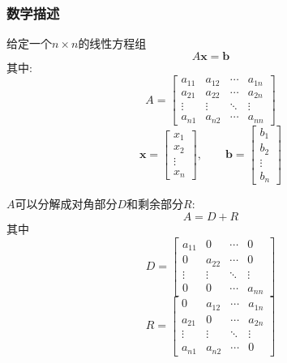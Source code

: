 \documentclass[twoside,twocolumn]{article}
\begin{document}
\begin{CJK*}{UTF8}{gkai}
	\subsubsection{数学描述}
	给定一个$n\times n$的线性方程组
	\begin{equation*}
	A\mathbf{x}=\mathbf{b}
	\end{equation*}
	其中:
	\begin{equation*}
	A={\begin{bmatrix}a_{11}&a_{12}&\cdots &a_{1n}\\a_{21}&a_{22}&\cdots &a_{2n}\\\vdots &\vdots &\ddots &\vdots \\a_{n1}&a_{n2}&\cdots &a_{nn}\end{bmatrix}}
	\end{equation*}
	\begin{equation*}
	\mathbf {x} ={\begin{bmatrix}x_{1}\\x_{2}\\\vdots \\x_{n}\end{bmatrix}},\qquad \mathbf {b} ={\begin{bmatrix}b_{1}\\b_{2}\\\vdots \\b_{n}\end{bmatrix}}
	\end{equation*}
	
	$A$可以分解成对角部分$D$和剩余部分$R$:
	\begin{equation*}
	A=D+R
	\end{equation*}
	其中
	\begin{equation*}
	D={\begin{bmatrix}a_{11}&0&\cdots &0\\0&a_{22}&\cdots &0\\\vdots &\vdots &\ddots &\vdots \\0&0&\cdots &a_{nn}\end{bmatrix}}
	\end{equation*}
	\begin{equation*}
	R={\begin{bmatrix}0&a_{12}&\cdots &a_{1n}\\a_{21}&0&\cdots &a_{2n}\\\vdots &\vdots &\ddots &\vdots \\a_{n1}&a_{n2}&\cdots &0\end{bmatrix}}
	\end{equation*}
	

\end{CJK*}
\end{document}
